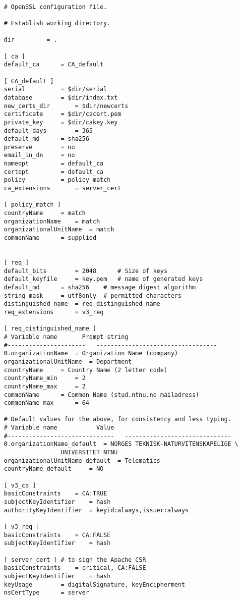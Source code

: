 \begin{lstlisting}

# OpenSSL configuration file.

# Establish working directory.

dir			= .

[ ca ]
default_ca		= CA_default

[ CA_default ]
serial			= $dir/serial
database		= $dir/index.txt
new_certs_dir		= $dir/newcerts
certificate		= $dir/cacert.pem
private_key		= $dir/cakey.key
default_days		= 365
default_md		= sha256
preserve		= no
email_in_dn		= no
nameopt			= default_ca
certopt			= default_ca
policy			= policy_match
ca_extensions		= server_cert

[ policy_match ]
countryName		= match
organizationName	= match
organizationalUnitName	= match
commonName		= supplied


[ req ]
default_bits		= 2048		# Size of keys
default_keyfile		= key.pem	# name of generated keys
default_md		= sha256	# message digest algorithm
string_mask		= utf8only	# permitted characters
distinguished_name	= req_distinguished_name
req_extensions		= v3_req

[ req_distinguished_name ]
# Variable name		  Prompt string
#----------------------	  ----------------------------------
0.organizationName	= Organization Name (company)
organizationalUnitName	= Department
countryName		= Country Name (2 letter code)
countryName_min		= 2
countryName_max		= 2
commonName		= Common Name (stud.ntnu.no mailadress)
commonName_max		= 64

# Default values for the above, for consistency and less typing.
# Variable name			  Value
#------------------------------	  ------------------------------
0.organizationName_default	= NORGES TEKNISK-NATURVITENSKAPELIGE \
				UNIVERSITET NTNU
organizationalUnitName_default	= Telematics
countryName_default		= NO

[ v3_ca ]
basicConstraints	= CA:TRUE
subjectKeyIdentifier	= hash
authorityKeyIdentifier	= keyid:always,issuer:always

[ v3_req ]
basicConstraints	= CA:FALSE
subjectKeyIdentifier	= hash

[ server_cert ] # to sign the Apache CSR
basicConstraints	= critical, CA:FALSE
subjectKeyIdentifier	= hash
keyUsage		= digitalSignature, keyEncipherment
nsCertType		= server



\end{lstlisting}
